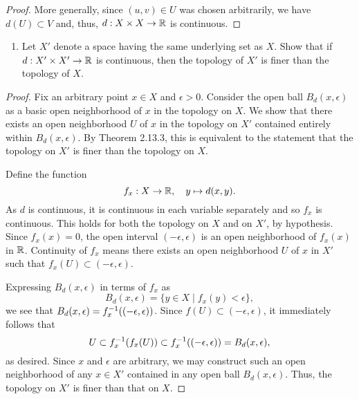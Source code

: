 \begin{solution}
\begin{proof}
        More generally, since $(u, v) \in U$ was chosen arbitrarily, we have $d(U) \subset V$ and, thus, $d: X \times X \rightarrow \mathbb{R}$ is continuous.
    \end{proof}
    \bigskip

    \begin{enumerate}[label={(\alph*)}, align=left, leftmargin=\parindent, listparindent=\parindent, labelwidth=0pt, itemindent=!]
        \addtocounter{enumi}{1} 
        \item Let $X'$ denote a space having the same underlying set as $X$.
        Show that if $d: X' \times X' \rightarrow \mathbb{R}$ is continuous, then the topology of $X'$ is finer than the topology of $X$.
    \end{enumerate}
    \begin{proof}
        Fix an arbitrary point $x \in X$ and $\epsilon > 0$.
        Consider the open ball $B_d(x, \epsilon)$ as a basic open neighborhood of $x$ in the topology on $X$.
        We show that there exists an open neighborhood $U$ of $x$ in the topology on $X'$ contained entirely within $B_d(x, \epsilon)$.
        By Theorem 2.13.3, this is equivalent to the statement that the topology on $X'$ is finer than the topology on $X$.

        Define the function
        \begin{equation*}
            f_x: X \rightarrow \mathbb{R},\quad y \mapsto d(x, y).
        \end{equation*}
        As $d$ is continuous, it is continuous in each variable separately and so $f_x$ is continuous.
        This holds for both the topology on $X$ and on $X'$, by hypothesis.
        Since $f_x(x) = 0$, the open interval $(-\epsilon, \epsilon)$ is an open neighborhood of $f_x(x)$ in $\mathbb{R}$.
        Continuity of $f_x$ means there exists an open neighborhood $U$ of $x$ in $X'$ such that $f_x(U) \subset (-\epsilon, \epsilon)$.

        Expressing $B_d(x, \epsilon)$ in terms of $f_x$ as
        \begin{equation*}
            B_d(x, \epsilon) = \{y \in X \mid f_x(y) < \epsilon\},
        \end{equation*}
        we see that $B_d(x, \epsilon) = f_x^{-1}((-\epsilon, \epsilon))$.
        Since $f(U) \subset (-\epsilon, \epsilon)$, it immediately follows that 
        \begin{equation*}
            U \subset f_x^{-1}(f_x(U)) \subset f_x^{-1}((-\epsilon, \epsilon)) = B_d(x, \epsilon),
        \end{equation*}
        as desired.
        Since $x$ and $\epsilon$ are arbitrary, we may construct such an open neighborhood of any $x \in X'$ contained in any open ball $B_d(x, \epsilon)$.
        Thus, the topology on $X'$ is finer than that on $X$.
    \end{proof}
\end{solution}
\newpage

